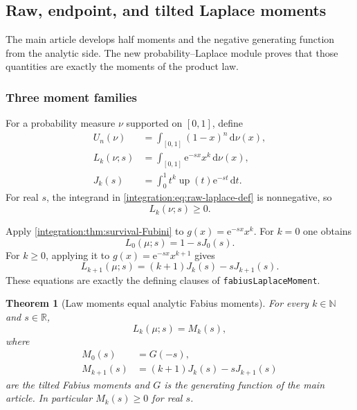 \documentclass[11pt,oneside]{article}
\newtheorem{theorem}{Theorem}[section]
\theoremstyle{definition}
\theoremstyle{remark}
\newcommand{\R}{\mathbb R}
\newcommand{\N}{\mathbb N}
\newcommand{\Up}{\operatorname{up}}
\newcommand{\e}{\mathrm e}
\newcommand{\dd}{\,\mathrm d}
\newcommand{\lean}[1]{%
  \ifmmode\text{\texttt{\detokenize{#1}}}\else\nolinkurl{#1}\fi}
\begin{document}
\subsection{Raw, endpoint, and tilted Laplace moments}
\label{integration:sec:probability-laplace}

The main article develops half moments and the negative generating function from the
analytic side.  The new probability--Laplace module proves that those quantities are exactly
the moments of the product law.

\subsubsection{Three moment families}

For a probability measure $\nu$ supported on $[0,1]$, define
\begin{align}
 U_n(\nu)&=\int_{[0,1]}(1-x)^n\dd\nu(x),                  \label{integration:eq:endpoint-moment-def}\\
 L_k(\nu;s)&=\int_{[0,1]}\e^{-sx}x^k\dd\nu(x),           \label{integration:eq:raw-laplace-def}\\
 J_k(s)&=\int_0^1t^k\Up(t)\e^{-st}\dd t.                 \label{integration:eq:survival-tilt-def}
\end{align}
For real $s$, the integrand in \eqref{integration:eq:raw-laplace-def} is nonnegative, so
\begin{equation}
 L_k(\nu;s)\ge0.
 \label{integration:eq:laplace-moment-nonnegative}
\end{equation}

Apply \cref{integration:thm:survival-Fubini} to $g(x)=\e^{-sx}x^k$.  For $k=0$ one obtains
\begin{equation}
 L_0(\mu;s)=1-sJ_0(s).
 \label{integration:eq:laplace-zero-survival}
\end{equation}
For $k\ge0$, applying it to $g(x)=\e^{-sx}x^{k+1}$ gives
\begin{equation}
 L_{k+1}(\mu;s)=(k+1)J_k(s)-sJ_{k+1}(s).
 \label{integration:eq:laplace-successor-survival}
\end{equation}
These equations are exactly the defining clauses of
\lean{fabiusLaplaceMoment}.

\begin{theorem}[Law moments equal analytic Fabius moments]
\label{integration:thm:law-moments-identification}
For every $k\in\N$ and $s\in\R$,
\begin{equation}
 L_k(\mu;s)=M_k(s),
 \label{integration:eq:law-M-identification}
\end{equation}
where
\begin{align}
 M_0(s)&=G(-s),                                            \label{integration:eq:M-zero}\\
 M_{k+1}(s)&=(k+1)J_k(s)-sJ_{k+1}(s)                      \label{integration:eq:M-successor}
\end{align}
are the tilted Fabius moments and $G$ is the generating function of the main article.
In particular $M_k(s)\ge0$ for real $s$.
\end{theorem}
\end{document}
